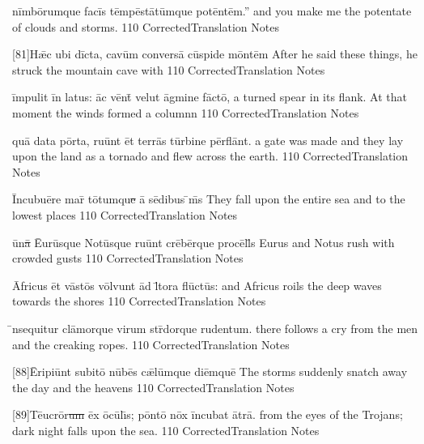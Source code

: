 \documentclass[]{book}
\begin{document}
\latline
  {n\=imb\={\macron o}r\-umqu\-e f\-ac\=is t\=emp\=est\={\macron a}t\=umqu\-e p\-ot\=ent\=em.''
}
  { and you make me the potentate of clouds and storms. }
  {110}
  { CorrectedTranslation }
  { Notes }


\latline
  {[81]H\={\ae}c \-ub\-i d\=ict\-a, c\-av\=um c\-onv\-ers\={\macron a} c\=usp\-id\-e m\=ont\=em
}
  { After he said these things, he struck the mountain cave with }
  {110}
  { CorrectedTranslation }
  { Notes }


\latline
  {\=imp\-ul\-it \=in l\-at\-us:  \=ac v\=ent\={\macron {\i}} v\-el\-ut \=agm\-in\-e f\=act\={\macron o},
}
  { a turned spear in its flank.  At that moment the winds formed a columnn }
  {110}
  { CorrectedTranslation }
  { Notes }

\newpage
\latline
  {qu\={\macron a} d\-at\-a p\=ort\-a, r\-u\=unt \=et t\-err\={\macron a}s t\=urb\-in\-e p\=erfl\=ant.
}
  { a gate was made and they lay upon the land as a tornado and flew across the earth. }
  {110}
  { CorrectedTranslation }
  { Notes }


\latline
  {\=Inc\-ub\-u\={\macron e}r\-e m\-ar\={\macron {\i}} t\={\macron o}tumqu\sout{e }\={\macron a} s\={\macron e}d\-ib\-us \={\macron {\i}}m\={\macron {\i}}s
}
  { They fall upon the entire sea and to the lowest places }
  {110}
  { CorrectedTranslation }
  { Notes }


\latline
  {\={\macron u}n\sout{\={\macron a} }\={Eu}r\=usqu\-e N\-ot\=usqu\-e r\-u\=unt cr\={\macron e}b\=erqu\-e pr\-oc\=ell\={\macron {\i}}s
}
  { Eurus and Notus rush with crowded gusts }
  {110}
  { CorrectedTranslation }
  { Notes }
\newpage

\latline
  {\={\macron A}fr\-ic\-us \=et v\=ast\={\macron o}s v\=olvunt \=ad l\={\macron {\i}}t\-or\-a fl\={\macron u}ct\={\macron u}s:
}
  { and Africus roils the deep waves towards the shores }
  {110}
  { CorrectedTranslation }
  { Notes }


\latline
  {\={\macron {\i}}nsequitur cl\={\macron a}morque virum str\={\macron {\i}}dorque rudentum.
}
  { there follows a cry from the men and the creaking ropes. }
  {110}
  { CorrectedTranslation }
  { Notes }

\latline
  {[88]\={\macron E}r\-ip\-i\=unt s\-ub\-it\={\macron o} n\={\macron u}b\={\macron e}s c\={\ae}l\=umqu\-e d\-i\=emqu\=e
}
  { The storms suddenly snatch away the day and the heavens }
  {110}
  { CorrectedTranslation }
  { Notes }


	\latline
	  {[89]T\={eu}cr\={\macron o}r\sout{um }\=ex \=oc\=ul\={\macron \i}s; p\=ont\={\macron o} n\=ox \=inc\-ub\-at \={\macron a}tr\=a.}
	  { from the eyes of the Trojans; dark night falls upon the sea. }
	  {110}
	  { CorrectedTranslation }
	  { Notes }
\end{document}
